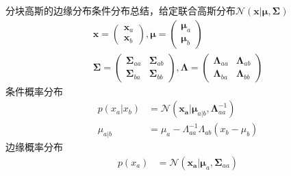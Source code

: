 \documentclass[a4paper]{article}
\begin{document}
分块高斯的边缘分布条件分布总结，给定联合高斯分布$\mathcal{N}(\mathbf{x}|\boldsymbol{\mu},\boldsymbol{\Sigma})$
\begin{align*}
  \boldsymbol{x} =
    \begin{pmatrix} \boldsymbol{x}_a\\ \boldsymbol{x}_b \end{pmatrix},
  \boldsymbol{\mu} =
    \begin{pmatrix} \boldsymbol{\mu}_a\\ \boldsymbol{\mu}_b \end{pmatrix}\\
  \boldsymbol{\Sigma} =
    \begin{pmatrix}
      \boldsymbol{\Sigma}_{aa} & \boldsymbol{\Sigma}_{ab}\\
      \boldsymbol{\Sigma}_{ba} & \boldsymbol{\Sigma}_{bb}
    \end{pmatrix},
  \boldsymbol{\Lambda} =
    \begin{pmatrix}
      \boldsymbol{\Lambda}_{aa} & \boldsymbol{\Lambda}_{ab}\\
      \boldsymbol{\Lambda}_{ba} & \boldsymbol{\Lambda}_{bb}
    \end{pmatrix}
\end{align*}
条件概率分布
\begin{align*}
  p(x_a|x_b) &= \mathcal{N}(\mathbf{x_a}|\boldsymbol{\mu}_{a|b},\boldsymbol{\Lambda}_{aa}^{-1})\\
  \mu_{a|b}  &=  \mu_a - \Lambda_{aa}^{-1}\Lambda_{ab}(x_b - \mu_b)
\end{align*}
边缘概率分布
\begin{align*}
  p(x_a) &= \mathcal{N}(\mathbf{x_a}|\boldsymbol{\mu}_a,\boldsymbol{\Sigma}_{aa})
\end{align*}
\end{document}
